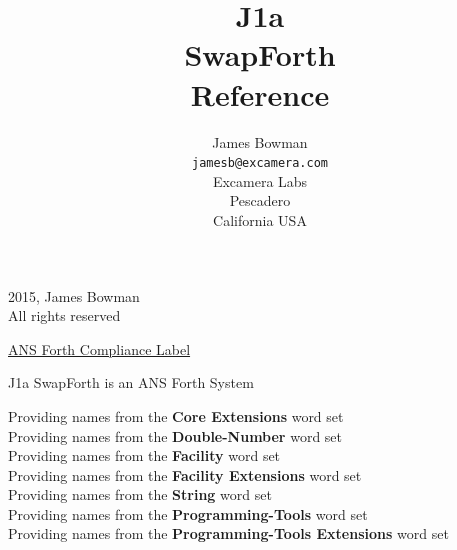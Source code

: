 \documentclass[10pt]{book}
\title{\LARGE \bf
J1a\\
SwapForth \\
Reference
}
\author{James Bowman \\
	{\tt\small jamesb@excamera.com} \\
  Excamera Labs \\
  Pescadero \\
  California USA \\
}
\date{}
\newcommand{\wl}[1]{\textbf{#1}}
\begin{document}
\maketitle

\begingroup
\footnotesize
\parindent 0pt
\parskip \baselineskip
\textcopyright{} 2015, James Bowman \\
All rights reserved

\begin{framed}

\underline{ANS Forth Compliance Label}

J1a SwapForth is an ANS Forth System

Providing names from the \wl{Core Extensions} word set \\
Providing names from the \wl{Double-Number} word set \\
Providing names from the \wl{Facility} word set \\
Providing names from the \wl{Facility Extensions} word set \\
Providing names from the \wl{String} word set \\
Providing names from the \wl{Programming-Tools} word set \\
Providing names from the \wl{Programming-Tools Extensions} word set

\end{framed}

% 
% 
% 
% 
\end{document}
